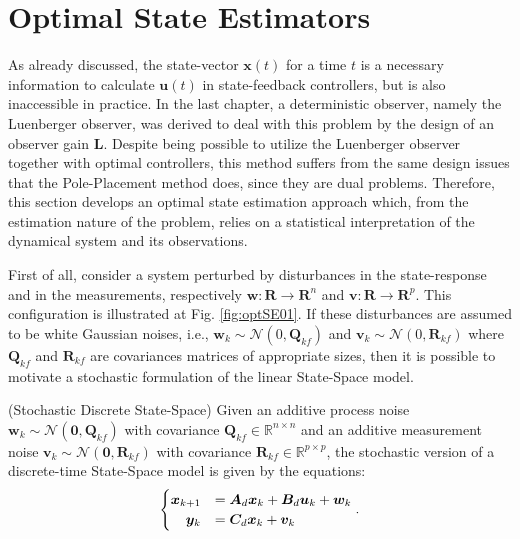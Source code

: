\documentclass[a4paper,11pt]{book}
\numberwithin{figure}{chapter}
\numberwithin{equation}{chapter}
\numberwithin{table}{chapter}
\theoremstyle{definition}
\newtheorem{definition}{Definition}[chapter]
\newcounter{boxed-theorem}
\newcounter{boxed-definition}
\newenvironment{boxed-definition}[1]
{\colorlet{shadecolor}{pastelYellow!15} \begin{shaded} \begin{definition}{#1}}
{\end{definition} \end{shaded}}
\newcounter{boxed-example}
\begin{document}
\section{Optimal State Estimators}

As already discussed, the state-vector $\bm{x}(t)$ for a time $t$ is a necessary information to calculate $\bm{u}(t)$ in state-feedback controllers, but is also inaccessible in practice. In the last chapter, a deterministic observer, namely the Luenberger observer, was derived to deal with this problem by the design of an observer gain $\bm{L}$. Despite being possible to utilize the Luenberger observer together with optimal controllers, this method suffers from the same design issues that the Pole-Placement method does, since they are dual problems. Therefore, this section develops an optimal state estimation approach which, from the estimation nature of the problem, relies on a statistical interpretation of the dynamical system and its observations.

First of all, consider a system perturbed by disturbances in the state-response and in the measurements, respectively $\bm{w} : \bm{R} \rightarrow \bm{R}^{n}$ and $\bm{v} : \bm{R} \rightarrow \bm{R}^{p}$. This configuration is illustrated at Fig. \ref{fig:optSE01}. If these disturbances are assumed to be white Gaussian noises, i.e., $\bm{w}_k \sim \mathcal{N}(0, \bm{Q}_{kf})$ and $\bm{v}_k \sim \mathcal{N}(0, \bm{R}_{kf})$ where $\bm{Q}_{kf}$ and $\bm{R}_{kf}$ are covariances matrices of appropriate sizes, then it is possible to motivate a stochastic formulation of the linear State-Space model.

\begin{boxed-definition}{(Stochastic Discrete State-Space)} \label{def:stochSS}
    Given an additive process noise $\bm{w}_k \sim \mathcal{N}(\bm{0}, \bm{Q}_{kf})$ with covariance $\bm{Q}_{kf} \in \mathbb{R}^{n \times n}$ and an additive measurement noise $\bm{v}_k \sim \mathcal{N}(\bm{0}, \bm{R}_{kf})$ with covariance $\bm{R}_{kf} \in \mathbb{R}^{p \times p}$, the stochastic version of a discrete-time State-Space model is given by the equations:
    \begin{align}
    \begin{cases}
        \hfill \bm{x}_{k+1} &= \bm{A}_d \bm{x}_k + \bm{B}_d \bm{u}_k + \bm{w}_k \\
        \hfill \bm{y}_k &= \bm{C}_d \bm{x}_k + \bm{v}_k 
    \end{cases}
    .\end{align}
\end{boxed-definition}
\end{document}
